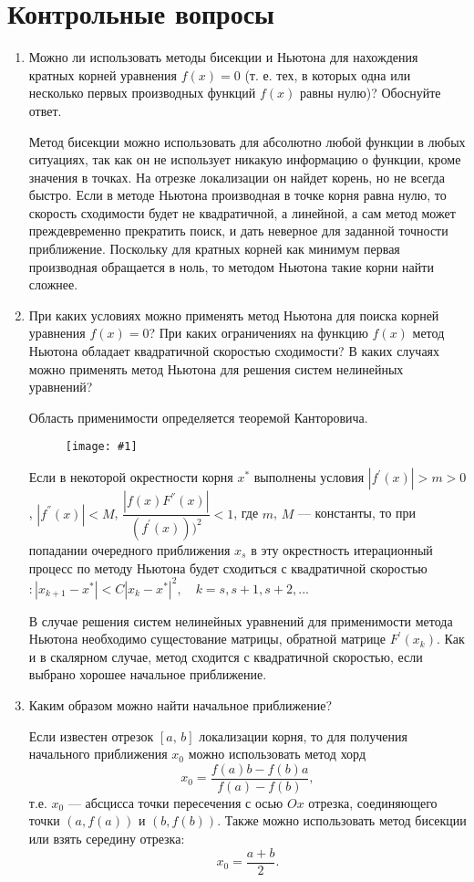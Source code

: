 \documentclass[12pt, a4paper]{article}
\newcommand{\Picture}[4]
{
\begin{figure}[H]
\noindent 
\centering\texttt{[image: \#1]}
\caption{#3}
\label{#4}
\end{figure}
}
\begin{document}
\section{Контрольные вопросы}
\begin{enumerate}
\item Можно ли использовать методы бисекции и Ньютона для нахождения кратных корней уравнения $f(x) = 0$ (т. е. тех, в которых одна или несколько первых производных функций $f(x)$ равны нулю)? Обоснуйте ответ.

Метод бисекции можно использовать для абсолютно любой функции в любых ситуациях, так как он не использует никакую информацию о функции, кроме значения в точках. На отрезке локализации он найдет корень, но не всегда быстро.  Если в методе Ньютона производная в точке корня равна нулю, то скорость сходимости будет не квадратичной, а линейной, а сам метод может преждевременно прекратить поиск, и дать неверное для заданной точности приближение. Поскольку для кратных корней как минимум первая производная обращается в ноль, то методом Ньютона такие корни найти сложнее.

\item При каких условиях можно применять метод Ньютона для поиска корней уравнения $f(x) = 0$? При каких ограничениях на функцию $f(x)$ метод Ньютона обладает квадратичной скоростью сходимости? В каких случаях можно применять метод Ньютона для решения систем нелинейных уравнений?

Область применимости определяется теоремой Канторовича.
\Picture{Канторович.png}{1}{}{MNK}

Если в некоторой окрестности корня $x^*$ выполнены условия $|f^'(x)| > m > 0$, $|f^{''}(x)|< M$, $\dfrac{|f(x)F^{''}(x)|}{(f^'(x)))^2} < 1$, где $m$, $M$ --- константы, то при попадании очередного приближения $x_s$ в эту окрестность итерационный процесс по методу Ньютона будет сходиться с квадратичной скоростью$\colon |x_{k+1} - x^*| < C |x_k - x^*|^2,\quad k = s, s + 1, s + 2, ...$

В случае решения систем нелинейных уравнений для применимости метода Ньютона необходимо сущестование матрицы, обратной матрице $F^'(x_k)$. Как и в скалярном случае, метод сходится с квадратичной скоростью, если выбрано хорошее начальное приближение.





\item Каким образом можно найти начальное приближение?

Если известен отрезок $ [a,\, b] $ локализации корня, то для получения начального приближения $x_0$ можно использовать метод хорд 
\[ 
x_0 = \dfrac{f(a) b - f(b) a}{f(a) - f(b)} ,
\]
т.е. $ x_0 $ --- абсцисса точки пересечения с осью $ Ox $ отрезка, соединяющего точки $ (a, f(a)) $ и $ (b, f(b)) $.
	 Также можно использовать метод бисекции или взять середину отрезка: 
\[
 x_0 = \dfrac{a + b}{2} .
\]


\end{enumerate}
\end{document}
